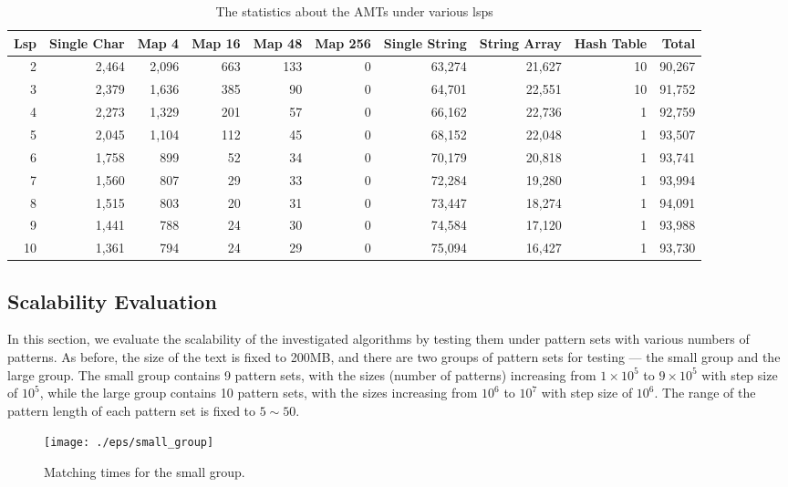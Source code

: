 \documentclass{article}
\begin{document}
\begin{table}[!htp]
  \centering
  \caption{The statistics about the AMTs under various lsps}
  \scriptsize
  \label{tab:node types}
  \begin{tabular}{rrrrrrrrrr}
 \hline
 Lsp &
 Single Char &
 Map 4 &
 Map 16 &
 Map 48 &
 Map 256 &
 Single String &
 String Array   &
 Hash Table &
 Total\\
 \hline
 2  & 2,464 & 2,096 & 663 & 133 & 0 & 63,274 &  21,627 & 10 & 90,267\\
 3  & 2,379 & 1,636 & 385 & 90  & 0 & 64,701 &  22,551 & 10 & 91,752\\
 4  & 2,273 & 1,329 & 201 & 57  & 0 & 66,162 &  22,736 &  1 & 92,759\\
 5  & 2,045 & 1,104 & 112 & 45  & 0 & 68,152 &  22,048 &  1 & 93,507\\
 6  & 1,758 &   899 &  52 & 34  & 0 & 70,179 &  20,818 &  1 & 93,741\\
 7  & 1,560 &   807 &  29 & 33  & 0 & 72,284 &  19,280 &  1 & 93,994\\
 8  & 1,515 &   803 &  20 & 31  & 0 & 73,447 &  18,274 &  1 & 94,091\\
 9  & 1,441 &   788 &  24 & 30  & 0 & 74,584 &  17,120 &  1 & 93,988\\
10  & 1,361 &   794 &  24 & 29  & 0 & 75,094 &  16,427 &  1 & 93,730\\
\hline
  \end{tabular}
\end{table}

\subsection{Scalability Evaluation}

In this section, we evaluate the scalability of the investigated
algorithms by testing them under pattern sets with various numbers of
patterns. As before, the size of the text is fixed to 200MB, and there
are two groups of pattern sets for testing --- the small group and the
large group. The small group contains 9 pattern sets, with the sizes
(number of patterns) increasing from $1 \times 10^5$ to
$9 \times 10^5$ with step size of $10^5$, while the large group
contains 10 pattern sets, with the sizes increasing from $10^6$ to
$10^7$ with step size of $10^6$. The range of the pattern length of
each pattern set is fixed to $5 \sim 50$.

\begin{figure}[htbp]
  \centering
  \texttt{[image: ./eps/small\_group]}
  \caption{Matching times for the small group.}
  \label{fig:small_group}
\end{figure}
\end{document}
